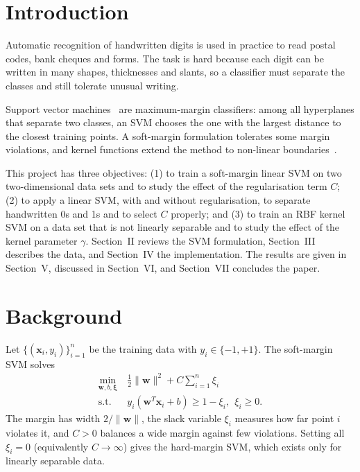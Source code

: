 \documentclass[conference,a4paper]{IEEEtran}
\begin{document}
\section{Introduction}
Automatic recognition of handwritten digits is used in practice to read postal codes, bank cheques and
forms. The task is hard because each digit can be written in many shapes, thicknesses and slants, so a
classifier must separate the classes and still tolerate unusual writing.

Support vector machines~\cite{cortes1995,boser1992} are maximum-margin classifiers: among all hyperplanes that
separate two classes, an SVM chooses the one with the largest distance to the closest training points. A soft-margin
formulation tolerates some margin violations, and kernel functions extend the method to non-linear boundaries~\cite{scholkopf2002}.

This project has three objectives: (1) to train a soft-margin linear SVM on two two-dimensional data sets and to
study the effect of the regularisation term $C$; (2) to apply a linear SVM, with and without regularisation, to separate
handwritten 0s and 1s and to select $C$ properly; and (3) to train an RBF kernel SVM on a data set that is not linearly
separable and to study the effect of the kernel parameter $\gamma$.
Section~II reviews the SVM formulation, Section~III describes the data, and Section~IV the implementation.
The results are given in Section~V, discussed in Section~VI, and Section~VII concludes the paper.

\section{Background}
Let $\{(\mathbf{x}_i,y_i)\}_{i=1}^{n}$ be the training data with $y_i\in\{-1,+1\}$. The soft-margin SVM solves
\begin{equation}
\begin{aligned}
\min_{\mathbf{w},b,\boldsymbol{\xi}}\ & \tfrac12\|\mathbf{w}\|^2 + C\sum_{i=1}^{n}\xi_i\\
\text{s.t.}\ & y_i(\mathbf{w}^{T}\mathbf{x}_i+b)\ge 1-\xi_i,\ \ \xi_i\ge 0 .
\end{aligned}
\label{eq:primal}
\end{equation}
The margin has width $2/\|\mathbf{w}\|$, the slack variable $\xi_i$ measures how far point $i$ violates it, and
$C>0$ balances a wide margin against few violations. Setting all $\xi_i=0$ (equivalently $C\to\infty$) gives the
hard-margin SVM, which exists only for linearly separable data.
\end{document}
